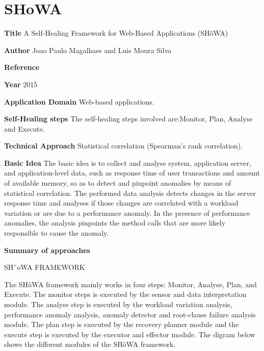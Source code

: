 \section{SHoWA} \label{ap:Showa}
\begin{compactitem}
\item[\textbf{Title}]A Self-Healing Framework for Web-Based Applications (SH\~oWA)

\item[\textbf{Author}]Joao Paulo Magalhaes and Luis Moura Silva

\item[\textbf{Reference}]

\cite{magalhaes_showa:_2015}

\item[\textbf{Year}] 2015

\item[\textbf{Application Domain}]
Web-based applications. 

\item[\textbf{Self-Healing steps}] 
The self-healing steps involved are:Monitor, Plan, Analyse and Execute.

\item[\textbf{Technical Approach}] Statistical correlation (Spearman's rank correlation). 

\item[\textbf{Basic Idea}] 
The basic idea is to collect and analyse system, application server, and application-level data, such as response time of user transactions and amount of available memory, so as to detect and pinpoint anomalies by means of statistical correlation. The performed data analysis detects changes in the server response time and analyses if those changes are correlated with a workload variation or are due to a performance anomaly. In the presence of performance anomalies, the analysis pinpoints the method calls that are more likely responsible to cause the anomaly.

\item[\textbf{Summary of approaches}] 

SH˜oWA FRAMEWORK

The SH\~oWA framework mainly works in four steps: Monitor, Analyse, Plan, and Execute. The monitor steps is executed by the sensor and data interpretation module. The analyse step is executed by the workload variation analysis, performance anomaly analysis, anomaly detector and root-clause failure analysis module. The plan step is executed by the recovery planner module and the execute step is executed by the executor and effector module. The digram below shows the different modules of the  SH\~oWA framework.


\end{compactitem}
